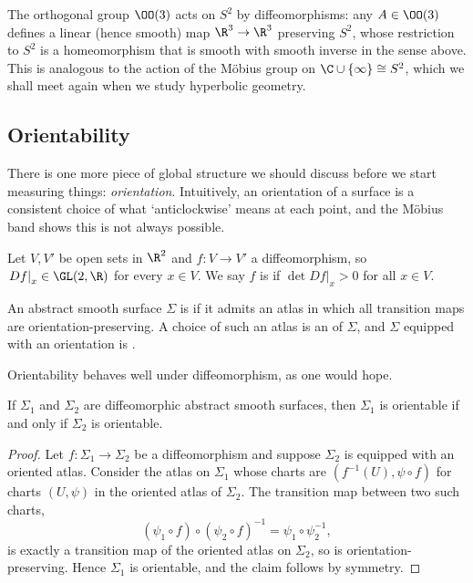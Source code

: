 \begin{example}[$\OO(3)$ Acting on $S^2$]
    The orthogonal group $\OO(3)$ acts on $S^2$ by diffeomorphisms: any $A \in \OO(3)$ defines a linear (hence smooth) map $\R^3 \rightarrow \R^3$ preserving $S^2$, whose restriction to $S^2$ is a homeomorphism that is smooth with smooth inverse in the sense above. This is analogous to the action of the M\"obius group on $\C \cup \{\infty\} \cong S^2$, which we shall meet again when we study hyperbolic geometry.
\end{example}

\subsection{Orientability}

There is one more piece of global structure we should discuss before we start measuring things: \emph{orientation}. Intuitively, an orientation of a surface is a consistent choice of what `anticlockwise' means at each point, and the M\"obius band shows this is not always possible.

\begin{definition}
    Let $V, V'$ be open sets in $\R^2$ and $f: V \rightarrow V'$ a diffeomorphism, so $\left.Df\right|_x \in \GL(2, \R)$ for every $x \in V$. We say $f$ is  if $\det \left.Df\right|_x > 0$ for all $x \in V$.
\end{definition}

\begin{definition}[Orientable]
    An abstract smooth surface $\Sigma$ is  if it admits an atlas in which all transition maps are orientation-preserving. A choice of such an atlas is an  of $\Sigma$, and $\Sigma$ equipped with an orientation is .
\end{definition}

Orientability behaves well under diffeomorphism, as one would hope.

\begin{lemma}
    If $\Sigma_1$ and $\Sigma_2$ are diffeomorphic abstract smooth surfaces, then $\Sigma_1$ is orientable if and only if $\Sigma_2$ is orientable.
\end{lemma}
\begin{proof}
    Let $f: \Sigma_1 \rightarrow \Sigma_2$ be a diffeomorphism and suppose $\Sigma_2$ is equipped with an oriented atlas. Consider the atlas on $\Sigma_1$ whose charts are $(f^{-1}(U), \psi \circ f)$ for charts $(U, \psi)$ in the oriented atlas of $\Sigma_2$. The transition map between two such charts,
    $$
    (\psi_1 \circ f) \circ (\psi_2 \circ f)^{-1} = \psi_1 \circ \psi_2^{-1},
    $$
    is exactly a transition map of the oriented atlas on $\Sigma_2$, so is orientation-preserving. Hence $\Sigma_1$ is orientable, and the claim follows by symmetry.
\end{proof}

